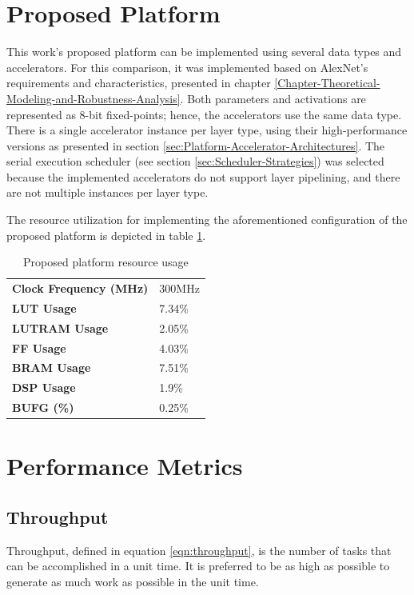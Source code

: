 \section{Proposed Platform}
\label{sec:proposed-platform-implementation}
This work's proposed platform can be implemented using several data types and accelerators. For this comparison, it was implemented based on AlexNet's requirements and characteristics, presented in chapter \ref{Chapter-Theoretical-Modeling-and-Robustness-Analysis}. Both parameters and activations are represented as 8-bit fixed-points; hence, the accelerators use the same data type. There is a single accelerator instance per layer type, using their high-performance versions as presented in section \ref{sec:Platform-Accelerator-Architectures}. The serial execution scheduler (see section \ref{sec:Scheduler-Strategies}) was selected because the implemented accelerators do not support layer pipelining, and there are not multiple instances per layer type.

The resource utilization for implementing the aforementioned configuration of the proposed platform is depicted in table \ref{tab:Proposed-platform-resource-usage}.

\begin{table}[H]
	\caption{Proposed platform resource usage}
	\label{tab:Proposed-platform-resource-usage}
	\centering
	\begin{tabular}{ll}
		\toprule
		\textbf{Clock Frequency (MHz)} & 300MHz \\
		\textbf{LUT Usage}             & 7.34\% \\
		\textbf{LUTRAM Usage}          & 2.05\% \\
		\textbf{FF Usage}              & 4.03\% \\
		\textbf{BRAM Usage}            & 7.51\% \\
		\textbf{DSP Usage}             & 1.9\%  \\
		\textbf{BUFG (\%)}             & 0.25\% \\
		\bottomrule
	\end{tabular}
\end{table}

\section{Performance Metrics}
\subsection{Throughput}
Throughput, defined in equation \ref{eqn:throughput}, is the number of tasks that can be accomplished in a unit time. It is preferred to be as high as possible to generate as much work as possible in the unit time.

